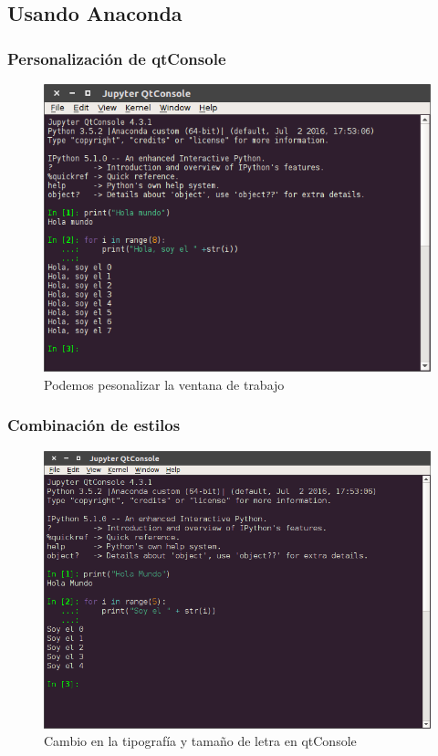 {\subsection{Usando Anaconda}
\begin{frame}
\frametitle{Personalización de qtConsole}
\begin{figure}
	\centering
	\includegraphics[scale=0.35]{qtConsole_02}
	\caption{Podemos pesonalizar la ventana de trabajo}
\end{figure}
\end{frame}
\begin{frame}
\frametitle{Combinación de estilos}
\begin{figure}
	\centering
	\includegraphics[scale=0.3]{qtConsole_03}
	\caption{Cambio en la tipografía y tamaño de letra en qtConsole}
\end{figure}
\end{frame}
}
